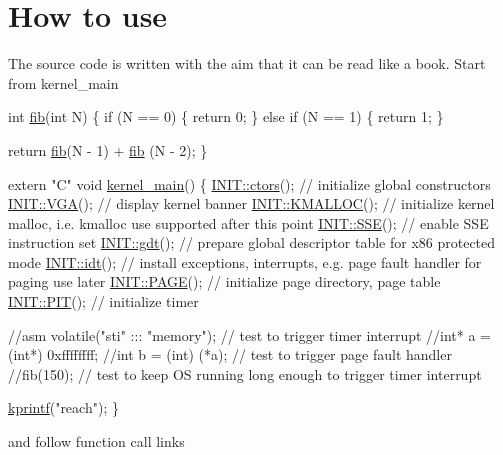 \hypertarget{index_intro_sec}{}\section{How to use}\label{index_intro_sec}
The source code is written with the aim that it can be read like a book. Start from kernel\+\_\+main 
\begin{DoxyCodeInclude}

\textcolor{keywordtype}{int} \hyperlink{kernel_8cpp_a29eea8749aebd3fede1d73352de7a739}{fib}(\textcolor{keywordtype}{int} N)
\{
    \textcolor{keywordflow}{if} (N == 0)
    \{
        \textcolor{keywordflow}{return} 0;
    \}
    \textcolor{keywordflow}{else} \textcolor{keywordflow}{if} (N == 1)
    \{
        \textcolor{keywordflow}{return} 1;
    \}

    \textcolor{keywordflow}{return} \hyperlink{kernel_8cpp_a29eea8749aebd3fede1d73352de7a739}{fib}(N - 1) + \hyperlink{kernel_8cpp_a29eea8749aebd3fede1d73352de7a739}{fib} (N - 2);
\}

\textcolor{keyword}{extern} \textcolor{stringliteral}{"C"} \textcolor{keywordtype}{void} \hyperlink{kernel_8cpp_ada8402e0c504af8cafef5cc76c076003}{kernel\_main}()
\{
    \hyperlink{namespace_i_n_i_t_a6608557e41ad37cdb4a408e2f05c9783}{INIT::ctors}();   \textcolor{comment}{// initialize global constructors}
    \hyperlink{namespace_i_n_i_t_abae5789d80f8edd37455f3b167779654}{INIT::VGA}();     \textcolor{comment}{// display kernel banner}
    \hyperlink{namespace_i_n_i_t_ac811302ce0948a6a097b445b811f9c14}{INIT::KMALLOC}(); \textcolor{comment}{// initialize kernel malloc, i.e. kmalloc use supported after this point}
    \hyperlink{namespace_i_n_i_t_a8928ddbb4ca671dfe1c740da380fa0c4}{INIT::SSE}();     \textcolor{comment}{// enable SSE instruction set}
    \hyperlink{namespace_i_n_i_t_a3462d7bc51bce77cc240d05b62b1b777}{INIT::gdt}();     \textcolor{comment}{// prepare global descriptor table for x86 protected mode}
    \hyperlink{namespace_i_n_i_t_aec8e9f01cb09653075b6e610096b3ca9}{INIT::idt}();     \textcolor{comment}{// install exceptions, interrupts, e.g. page fault handler for paging use
       later}
    \hyperlink{namespace_i_n_i_t_aea383d3de30095cf9d176fa60b66d01d}{INIT::PAGE}();    \textcolor{comment}{// initialize page directory, page table}
    \hyperlink{namespace_i_n_i_t_a6fa46ed9b50062458ede3692a4865c51}{INIT::PIT}();     \textcolor{comment}{// initialize timer}

    \textcolor{comment}{//asm volatile("sti" ::: "memory"); // test to trigger timer interrupt}
    \textcolor{comment}{//int* a = (int*) 0xffffffff;}
    \textcolor{comment}{//int b = (int) (*a); // test to trigger page fault handler}
    \textcolor{comment}{//fib(150); // test to keep OS running long enough to trigger timer interrupt}

    \hyperlink{kprintf_8h_ae610f6b2bc90ea3eed7852d591c48116}{kprintf}(\textcolor{stringliteral}{"reach"});
\}
\end{DoxyCodeInclude}
and follow function call links 